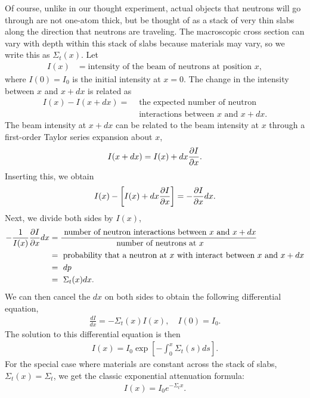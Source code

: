 Of course, unlike in our thought experiment, actual objects that neutrons will go through are not one-atom thick, but be thought of as a stack of very thin slabs along the direction that neutrons are traveling. The macroscopic cross section can vary with depth within this stack of slabs because materials may vary, so we write this as $\Sigma_t(x)$. Let
\begin{align}
  I(x) &= \text{intensity of the beam of neutrons at position $x$}, \nonumber
\end{align}
where $I(0) = I_0$ is the initial intensity at $x = 0$. The change in the intensity between $x$ and $x + dx$ is related as
\begin{align}
  I(x) - I(x+dx) = 	&\text{ the expected number of neutron} \nonumber \\ 
  					&\text{ interactions between $x$ and $x + dx$}. \nonumber
\end{align}
The beam intensity at $x + dx$ can be related to the beam intensity at $x$ through a first-order Taylor series expansion about $x$,
\begin{align}
  I(x+dx) = I(x) + dx \frac{ \partial {I} }{ \partial {x} } . \nonumber
\end{align}
Inserting this, we obtain
\begin{align}
  I(x) - \left[ I(x) + dx \frac{ \partial {I} }{ \partial {x} } \right] = -\frac{ \partial {I} }{ \partial {x} } dx. \nonumber
\end{align}
Next, we divide both sides by $I(x)$,
\begin{align}
  -\frac{1}{I(x)} \frac{ \partial {I} }{ \partial {x} } dx &= 
  \frac{\text{ number of neutron interactions between $x$ and $x + dx$}}{\text{ number of neutrons at $x$}} \nonumber \\
  &= \text{ probability that a neutron at $x$ with interact between $x$ and $x + dx$} \nonumber \\
  &= \ dp \nonumber \\
  &= \ \Sigma_t(x) dx. \nonumber
\end{align}
We can then cancel the $dx$ on both sides to obtain the following differential equation,
\begin{align}
  \frac{dI}{dx} = -\Sigma_t(x) I(x) , \quad I(0) = I_0 .
\end{align}
The solution to this differential equation is then
\begin{align}
  I(x) = I_0 \exp\left[ -\int_0^x \Sigma_t(s) ds \right] .
\end{align}
For the special case where materials are constant across the stack of slabs, $\Sigma_t(x) = \Sigma_t$, we get the classic exponential attenuation formula:
\begin{align}
  I(x) = I_0 e^{-\Sigma_t x} .
\end{align}

